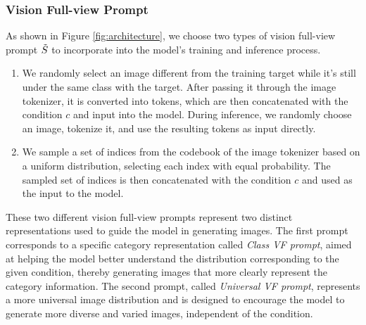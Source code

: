 \subsubsection{Vision Full-view Prompt} 
\label{Prompt}
As shown in Figure \ref{fig:architecture}, we choose two types of vision full-view prompt $\Tilde{S}$ to incorporate into the model's training and inference process.
\begin{enumerate}
    \item We randomly select an image different from the training target while it's still under the same class with the target. After passing it through the image tokenizer, it is converted into tokens, which are then concatenated with the condition $c$ and input into the model. During inference, we randomly choose an image, tokenize it, and use the resulting tokens as input directly. 
    \item We sample a set of indices from the codebook of the image tokenizer based on a uniform distribution, selecting each index with equal probability. The sampled set of indices is then concatenated with the condition $c$ and used as the input to the model.
\end{enumerate}
These two different vision full-view prompts represent two distinct representations used to guide the model in generating images. The first prompt corresponds to a specific category representation called \textit{Class VF prompt}, aimed at helping the model better understand the distribution corresponding to the given condition, thereby generating images that more clearly represent the category information. The second prompt, called \textit{Universal VF prompt}, represents a more universal image distribution and is designed to encourage the model to generate more diverse and varied images, independent of the condition.








